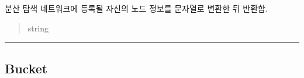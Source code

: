 \documentclass[a4paper,10pt,english]{sphinxmanual}
\begin{document}
\begin{fulllineitems}
\begin{fulllineitems}
\begin{itemize}
\end{itemize}



\end{fulllineitems}


\begin{fulllineitems}
\label{\detokenize{_kademlia:KNode.toString}}
\pysigstartsignatures
{}
\pysigstopsignatures
\sphinxAtStartPar
분산 탐색 네트워크에 등록될 자신의 노드 정보를 문자열로 변환한 뒤 반환함.
\begin{quote}\begin{description}
\sphinxAtStartPar
string

\end{description}\end{quote}

\end{fulllineitems}


\end{fulllineitems}



\bigskip\hrule\bigskip



\subsection{Bucket}
\label{\detokenize{_kademlia:bucket}}
\end{document}

